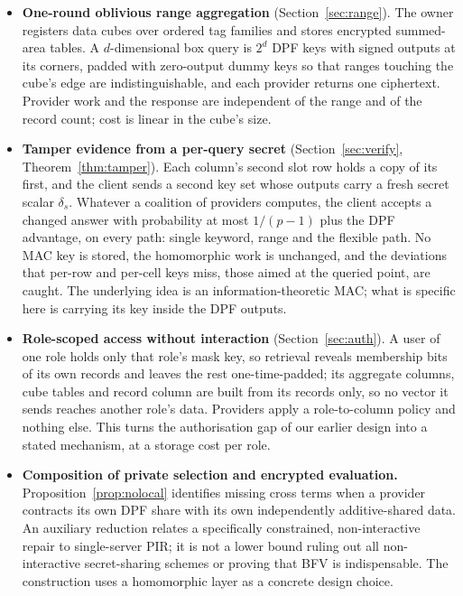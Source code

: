 \documentclass[a4paper,fleqn]{cas-sc}
\begin{document}
\begin{itemize}
\item \textbf{One-round oblivious range aggregation} (Section~\ref{sec:range}).
The owner registers data cubes over ordered tag families and stores encrypted
summed-area tables. A $d$-dimensional box query is $2^d$ DPF keys with signed
outputs at its corners, padded with zero-output dummy keys so that ranges
touching the cube's edge are indistinguishable, and each provider returns one
ciphertext. Provider work and the response are independent of the range and of
the record count; cost is linear in the cube's size.

\item \textbf{Tamper evidence from a per-query secret}
(Section~\ref{sec:verify}, Theorem~\ref{thm:tamper}). Each column's second slot
row holds a copy of its first, and the client sends a second key set whose
outputs carry a fresh secret scalar $\delta_s$. Whatever a coalition of
providers computes, the client accepts a changed answer with probability at
most $1/(p-1)$ plus the DPF advantage, on every path: single keyword, range and
the flexible path. No MAC key is stored, the homomorphic work is unchanged, and
the deviations that per-row and per-cell keys miss, those aimed at the queried
point, are caught. The underlying idea is an information-theoretic MAC; what
is specific here is carrying its key inside the DPF outputs.

\item \textbf{Role-scoped access without interaction} (Section~\ref{sec:auth}).
A user of one role holds only that role's mask key, so retrieval reveals
membership bits of its own records and leaves the rest one-time-padded; its
aggregate columns, cube tables and record column are built from its records
only, so no vector it sends reaches another role's data. Providers apply a
role-to-column policy and nothing else. This turns the authorisation gap of our
earlier design into a stated mechanism, at a storage cost per role.

\item \textbf{Composition of private selection and encrypted evaluation.}
Proposition~\ref{prop:nolocal} identifies missing cross terms when a
provider contracts its own DPF share with its own independently additive-shared
data. An auxiliary reduction relates a specifically constrained, non-interactive
repair to single-server PIR; it is not a lower bound ruling out all
non-interactive secret-sharing schemes or proving that BFV is indispensable.
The construction uses a homomorphic layer as a concrete design choice.


\end{itemize}
\end{document}
